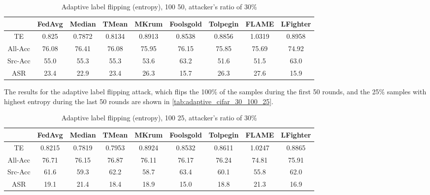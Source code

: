 \begin{table}[h!]
        \centering
        \small
        \begin{adjustbox}{center}
        \begin{tabular}{|c|c|c|c|c|c|c|c|c|}
            \hline
            & FedAvg & Median & TMean & MKrum & Foolsgold & Tolpegin & FLAME & LFighter \\
            \hline
            TE & 0.825 & 0.7872 & 0.8134 & 0.8913 & 0.8538 & 0.8856 & 1.0319 & 0.8958 \\
            \hline
            All-Acc & 76.08 & 76.41 & 76.08 & 75.95 & 76.15 & 75.85 & 75.69 & 74.92 \\
            \hline
            Src-Acc & 55.0 & 55.3 & 55.3 & 53.6 & 63.2 & 51.6 & 51.5 & 63.0 \\
            \hline
            ASR & 23.4 & 22.9 & 23.4 & 26.3 & 15.7 & 26.3 & 27.6 & 15.9 \\
            \hline
        \end{tabular}
        \end{adjustbox}
        \caption{Adaptive label flipping (entropy), 100 50, attacker's ratio of 30\%}
        \label{tab:adaptive_cifar_30_100_50}
    \end{table}
    
The results for the adaptive label flipping attack, which flips the 100\% of the samples during the first 50 rounds, and the 25\% samples with highest entropy during the last 50 rounds are shown in \autoref{tab:adaptive_cifar_30_100_25}.

\begin{table}[h!]
        \centering
        \small
        \begin{adjustbox}{center}
        \begin{tabular}{|c|c|c|c|c|c|c|c|c|}
            \hline
            & FedAvg & Median & TMean & MKrum & Foolsgold & Tolpegin & FLAME & LFighter \\
            \hline
            TE & 0.8215 & 0.7819 & 0.7953 & 0.8924 & 0.8532 & 0.8611 & 1.0247 & 0.8865 \\
            \hline
            All-Acc & 76.71 & 76.15 & 76.87 & 76.11 & 76.17 & 76.24 & 74.81 & 75.91 \\
            \hline
            Src-Acc & 61.6 & 59.3 & 62.2 & 58.7 & 63.4 & 60.1 & 55.8 & 62.0 \\
            \hline
            ASR & 19.1 & 21.4 & 18.4 & 18.9 & 15.0 & 18.8 & 21.3 & 16.9 \\
            \hline
        \end{tabular}
        \end{adjustbox}
        \caption{Adaptive label flipping (entropy), 100 25, attacker's ratio of 30\%}
        \label{tab:adaptive_cifar_30_100_25}
    \end{table}
    
